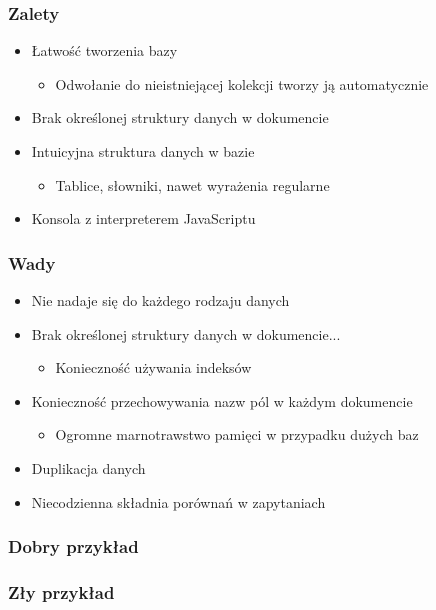 \documentclass{beamer}
\begin{document}
  \begin{frame}
    \frametitle{Zalety}
    \begin{itemize}
      \item Łatwość tworzenia bazy
      \begin{itemize}
        \item Odwołanie do nieistniejącej kolekcji tworzy ją automatycznie
      \end{itemize}
      \item Brak określonej struktury danych w dokumencie
      \item Intuicyjna struktura danych w bazie
      \begin{itemize}
        \item Tablice, słowniki, nawet wyrażenia regularne
      \end{itemize}
      \item Konsola z interpreterem JavaScriptu
    \end{itemize}
  \end{frame}

  \begin{frame}
    \frametitle{Wady}
    \begin{itemize}
      \item Nie nadaje się do każdego rodzaju danych
      \item Brak określonej struktury danych w dokumencie...
      \begin{itemize}
        \item Konieczność używania indeksów
      \end{itemize}
      \item Konieczność przechowywania nazw pól w każdym dokumencie
      \begin{itemize}
        \item Ogromne marnotrawstwo pamięci w przypadku dużych baz
      \end{itemize}
      \item Duplikacja danych
      \item Niecodzienna składnia porównań w zapytaniach
    \end{itemize}
  \end{frame}

  \begin{frame}
    \frametitle{Dobry przykład}
  \end{frame}

  \begin{frame}
    \frametitle{Zły przykład}
  \end{frame}
\end{document}
